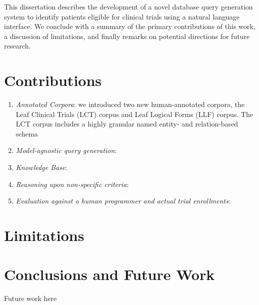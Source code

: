 \documentclass[../main.tex]{subfiles}
\begin{document}
This dissertation describes the development of a novel database query generation system to identify patients eligible for clinical trials using a natural language interface. We conclude with a summary of the primary contributions of this work, a discussion of limitations, and finally remarks on potential directions for future research.

\section{Contributions}

\begin{enumerate}
    \item \textit{Annotated Corpora}: we introduced two new human-annotated corpora, the Leaf Clinical Trials (LCT) corpus and Leaf Logical Forms (LLF) corpus. The LCT corpus includes a highly granular named entity- and relation-based schema 
    \item \textit{Model-agnostic query generation}: 
    \item \textit{Knowledge Base}: 
    \item \textit{Reasoning upon non-specific criteria}: 
    \item \textit{Evaluation against a human programmer and actual trial enrollments}: 
\end{enumerate}

\section{Limitations}

\section{Conclusions and Future Work}

Future work here
\end{document}

